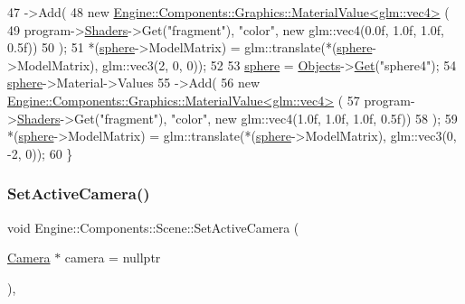 \begin{DoxyCode}
47         ->Add(
48             \textcolor{keyword}{new} \mbox{\hyperlink{classEngine_1_1Components_1_1Graphics_1_1MaterialValue}{Engine::Components::Graphics::MaterialValue<glm::vec4>}}
      (
49                 program->\mbox{\hyperlink{classEngine_1_1Components_1_1Graphics_1_1Program_aff39fa56fc1fab1bce6c8a5ce29ae161}{Shaders}}->Get(\textcolor{stringliteral}{"fragment"}), \textcolor{stringliteral}{"color"}, \textcolor{keyword}{new} glm::vec4(0.0f, 1.0f, 1.0f, 0.5f))
50         );
51     *(\mbox{\hyperlink{2_2sphere_8h_a3663362197033eb86a9dcecea5a9d25f}{sphere}}->ModelMatrix) = glm::translate(*(\mbox{\hyperlink{2_2sphere_8h_a3663362197033eb86a9dcecea5a9d25f}{sphere}}->ModelMatrix), glm::vec3(2, 0, 0));
52 
53     \mbox{\hyperlink{2_2sphere_8h_a3663362197033eb86a9dcecea5a9d25f}{sphere}} = \mbox{\hyperlink{classEngine_1_1Components_1_1Scene_a23481feabaaa56bf5613765db03af4da}{Objects}}->\mbox{\hyperlink{classGeneric_1_1Dictionary_ad018bc166486129b48e9ededce313984}{Get}}(\textcolor{stringliteral}{"sphere4"});
54     \mbox{\hyperlink{2_2sphere_8h_a3663362197033eb86a9dcecea5a9d25f}{sphere}}->Material->Values
55         ->Add(
56             \textcolor{keyword}{new} \mbox{\hyperlink{classEngine_1_1Components_1_1Graphics_1_1MaterialValue}{Engine::Components::Graphics::MaterialValue<glm::vec4>}}
      (
57                 program->\mbox{\hyperlink{classEngine_1_1Components_1_1Graphics_1_1Program_aff39fa56fc1fab1bce6c8a5ce29ae161}{Shaders}}->Get(\textcolor{stringliteral}{"fragment"}), \textcolor{stringliteral}{"color"}, \textcolor{keyword}{new} glm::vec4(1.0f, 1.0f, 1.0f, 0.5f))
58         );
59     *(\mbox{\hyperlink{2_2sphere_8h_a3663362197033eb86a9dcecea5a9d25f}{sphere}}->ModelMatrix) = glm::translate(*(\mbox{\hyperlink{2_2sphere_8h_a3663362197033eb86a9dcecea5a9d25f}{sphere}}->ModelMatrix), glm::vec3(0, -2, 0));
60 \}
\end{DoxyCode}
\mbox{\label{classEngine_1_1Components_1_1Scene_a936218df56c481f3aa12d684cee038f3}} 
\subsubsection{\texorpdfstring{Set\+Active\+Camera()}{SetActiveCamera()}}
{\footnotesize\ttfamily void Engine\+::\+Components\+::\+Scene\+::\+Set\+Active\+Camera (\begin{DoxyParamCaption}\item[{\mbox{\hyperlink{classEngine_1_1Components_1_1Camera}{Camera}} $\ast$}]{camera = {\ttfamily nullptr} }\end{DoxyParamCaption})\hspace{0.3cm}{\ttfamily [virtual]}, {\ttfamily [inherited]}}



